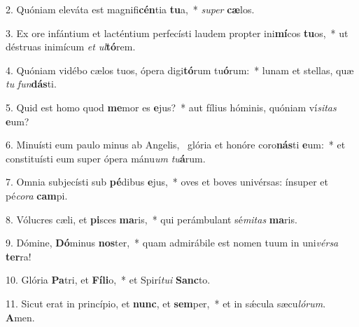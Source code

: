 2. Quóniam eleváta est magnifi\textbf{cén}tia \textbf{tu}a,~*  \textit{su}\textit{per} \textbf{cæ}los.\

3. Ex ore infántium et lacténtium perfecísti laudem propter ini\textbf{mí}cos \textbf{tu}os,~*  ut déstruas inimícum \textit{et} \textit{ul}\textbf{tó}rem.\

4. Quóniam vidébo cælos tuos, ópera digi\textbf{tó}rum tu\textbf{ó}rum:~*  lunam et stellas, quæ \textit{tu} \textit{fun}\textbf{dás}ti.\

5. Quid est homo quod \textbf{me}mor es \textbf{e}jus?~*  aut fílius hóminis, quóniam ví\textit{si}\textit{tas} \textbf{e}um?\

6. Minuísti eum paulo minus ab Angelis, \dag\  glória et honóre coro\textbf{nás}ti \textbf{e}um:~*  et constituísti eum super ópera mánu\textit{um} \textit{tu}\textbf{á}rum.\

7. Omnia subjecísti sub \textbf{pé}dibus \textbf{e}jus,~*  oves et boves univérsas: ínsuper et pé\textit{co}\textit{ra} \textbf{cam}pi.\

8. Vólucres cæli, et \textbf{pi}sces \textbf{ma}ris,~*  qui perámbulant sé\textit{mi}\textit{tas} \textbf{ma}ris.\

9. Dómine, \textbf{Dó}minus \textbf{nos}ter,~*  quam admirábile est nomen tuum in uni\textit{vér}\textit{sa} \textbf{ter}ra!\

10. Glória \textbf{Pa}tri, et \textbf{Fí}\textbf{li}o,~*  et Spirí\textit{tu}\textit{i} \textbf{Sanc}to.\

11. Sicut erat in princípio, et \textbf{nunc}, et \textbf{sem}per,~*  et in sǽcula sæcu\textit{ló}\textit{rum}. \textbf{A}men.\

